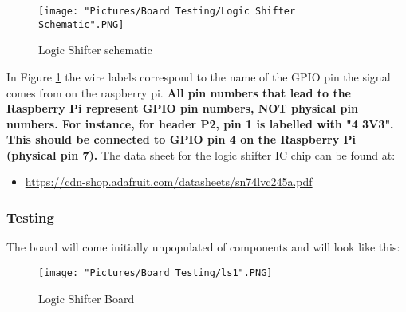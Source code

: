 \documentclass[12pt]{article}
\begin{document}
\begin{figure}[H]
  	\centering
    	\texttt{[image: "Pictures/Board Testing/Logic Shifter Schematic".PNG]}
 	\caption{Logic Shifter schematic}
	\label{ls sch}
\end{figure}

In Figure \ref{ls sch} the wire labels correspond to the name of the GPIO pin the signal comes from on the raspberry pi.  \textbf{All pin numbers that lead to the Raspberry Pi represent GPIO pin numbers, NOT physical pin numbers.  For instance, for header P2, pin 1 is labelled with "4 3V3".  This should be connected to GPIO pin 4 on the Raspberry Pi (physical pin 7).} The data sheet for the logic shifter IC chip can be found at: 
\begin{itemize}
	\item \href{https://cdn-shop.adafruit.com/datasheets/sn74lvc245a.pdf}{https://cdn-shop.adafruit.com/datasheets/sn74lvc245a.pdf}
\end{itemize}

\subsubsection{Testing}

The board will come initially unpopulated of components and will look like this:

\begin{figure}[H]
  	\centering
    	\texttt{[image: "Pictures/Board Testing/ls1".PNG]}
 	\caption{Logic Shifter Board}
	\label{ls1}
\end{figure}
\end{document}
